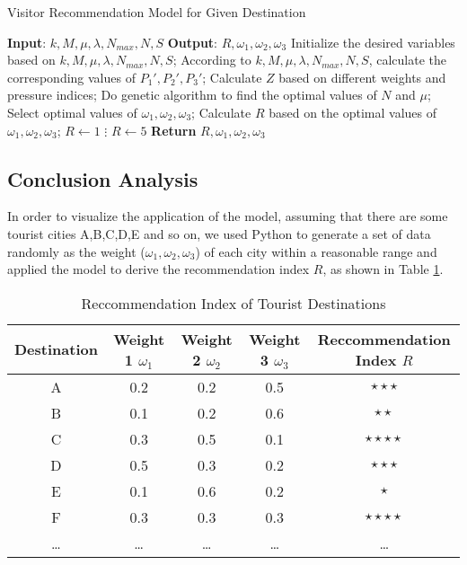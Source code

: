 \documentclass{mcmthesis}
\begin{document}
\begin{algorithm}[H]
  \caption{Visitor Recommendation Model for Given Destination}
  \begin{algorithmic}[1]
      \State \textbf{Input}: $k, M, \mu, \lambda, N_{max}, N, S$
      \State \textbf{Output}: $R, \omega_1, \omega_2, \omega_3$
      \State Initialize the desired variables based on $k, M, \mu, \lambda, N_{max}, N, S$;
          \State According to $k, M, \mu, \lambda, N_{max}, N, S$, calculate the corresponding values of $P_1', P_2', P_3'$;
          \State Calculate $Z$ based on different weights and pressure indices;
          \State Do genetic algorithm to find the optimal values of $N$ and $\mu$;
      \EndFor
      \State Select optimal values of $\omega_1, \omega_2, \omega_3$;
      \State Calculate $R$ based on the optimal values of $\omega_1, \omega_2, \omega_3$;
              \State $R \gets 1$
              \State $\vdots$
              \State $R \gets 5$
      \EndSwitch
      \State \textbf{Return} $R, \omega_1, \omega_2, \omega_3$
  \end{algorithmic}
\end{algorithm}
\subsection{Conclusion Analysis}
{In order to visualize the application of the model, assuming that there are some tourist cities A,B,C,D,E and so on, we used Python to generate a set of data randomly as the weight ($\omega_1, \omega_2, \omega_3$) of each city within a reasonable range and applied the model to derive the recommendation index $R$, as shown in Table \ref{tab:Recommendations}.}
\begin{table}[H]
  \centering
  \caption{Reccommendation Index of Tourist Destinations}\label{tab:Recommendations}
  \begin{tabular}{c c c c c}
      \toprule
      Destination & Weight 1 $\omega_1$ & Weight 2 $\omega_2$ & Weight 3 $\omega_3$ & Reccommendation Index $R$ \\
      \midrule
      A & 0.2 & 0.2 & 0.5 & $\star\star\star$ \\
      B & 0.1 & 0.2 & 0.6 & $\star\star$ \\
      C & 0.3 & 0.5 & 0.1 & $\star\star\star\star$ \\
      D & 0.5 & 0.3 & 0.2 & $\star\star\star$ \\
      E & 0.1 & 0.6 & 0.2 & $\star$ \\
      F & 0.3 & 0.3 & 0.3 & $\star\star\star\star$ \\
      \ldots & \ldots & \ldots & \ldots & \ldots \\
      \bottomrule
  \end{tabular}
\end{table}
\end{document}

